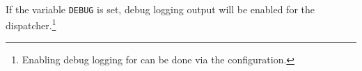 
\noindent\\If the variable \texttt{DEBUG} is set, debug logging output will be enabled for the
dispatcher.\footnote{Enabling debug logging for \cxflow can be done via the \cxflow configuration.}  


